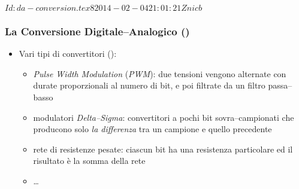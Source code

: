 %
%
\svnInfo $Id: da-conversion.tex 8 2014-02-04 21:01:21Z nicb $

\setcounter{ms}{0}
\begin{frame}
    \frametitle{La Conversione Digitale--Analogico ()}

    \begin{itemize}[<+- | alert@+->]
        \item Vari tipi di convertitori ():

            \begin{itemize}[<+- | alert@+->]
                \item{\emph{Pulse Width Modulation} (\emph{PWM}): due 
                    tensioni vengono alternate con durate proporzionali al
                    numero di bit, e poi filtrate da un filtro passa--basso}
                \item{modulatori \emph{Delta--Sigma}: convertitori a pochi bit
                    sovra--campionati che producono solo \emph{la differenza}
                    tra un campione e quello precedente}
                \item{rete di resistenze pesate: ciascun bit ha una resistenza
                    particolare ed il risultato \`e la somma della rete}
                \item \dots
            \end{itemize}

    \end{itemize}

\end{frame}
